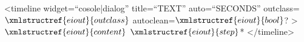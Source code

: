 <timeline widget=``cosole|dialog'' title=``TEXT'' auto=``SECONDS'' outclass=$\xmlstructref{eiout}{outclass}$ autoclean=$\xmlstructref{eiout}{bool}$? > 
  $\xmlstructref{eiout}{content}$
  $\xmlstructref{eiout}{step}$*
</timeline>
